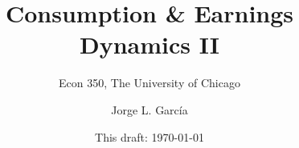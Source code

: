 

\title{Consumption \& Earnings Dynamics II}
\subtitle{Econ 350, The University of Chicago}
\author{Jorge L. Garc\'{i}a}
\date{This draft: \today}



\begin{frame}[plain]
	\titlepage
\end{frame}


\AtBeginSection[]

